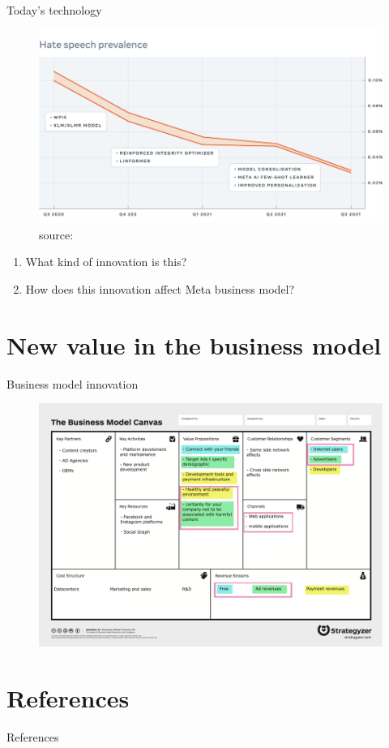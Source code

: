 \documentclass{beamer}
\begin{document}
\begin{frame}{Today's technology}
  \begin{figure}
    \centering
    \includegraphics[width=.8\textwidth]{images/fsl_chart}
    \caption{source: \cite{site:AIart}}
  \end{figure}
\end{frame}

\begin{frame}
  \begin{enumerate}
  \item What kind of innovation is this?
  \item How does this innovation affect Meta business model?
  \end{enumerate}
\end{frame}

\section{New value in the business model}
\begin{frame}{Business model innovation}
  \begin{figure}
    \includegraphics[width=.8\textwidth]{images/newcanvas.png}
  \end{figure}
\end{frame}

\section*{References}
\begin{frame}{References}
  \printbibliography
\end{frame}
\end{document}
